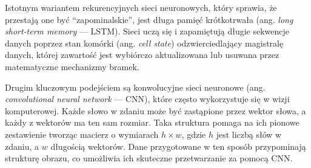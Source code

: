         \noindent Istotnym wariantem rekurencyjnych sieci neuronowych, który sprawia, że  przestają one być \enquote{zapominalskie}, jest długa pamięć krótkotrwała (ang. \textit{long short-term memory} — LSTM). Sieci uczą się i zapamiętują długie sekwencje danych poprzez stan komórki (ang. \textit{cell state}) odzwierciedlający magistralę danych, której zawartość jest wybiórczo aktualizowana lub usuwana przez matematyczne mechanizmy bramek.

       Drugim kluczowym podejściem są konwolucyjne sieci neuronowe (ang. \textit{convolutional neural network} — CNN), które często wykorzystuje się w wizji komputerowej. Każde słowo w zdaniu może być zastąpione przez wektor słowa, a każdy z wektorów ma ten sam rozmiar. Taka struktura pomaga na ich pionowe zestawienie tworząc macierz o wymiarach $h \times w$, gdzie $h$ jest liczbą słów w zdaniu, a $w$ długością wektorów. Dane przygotowane w ten sposób przypominają strukturę obrazu, co umożliwia ich skuteczne przetwarzanie za pomocą CNN.